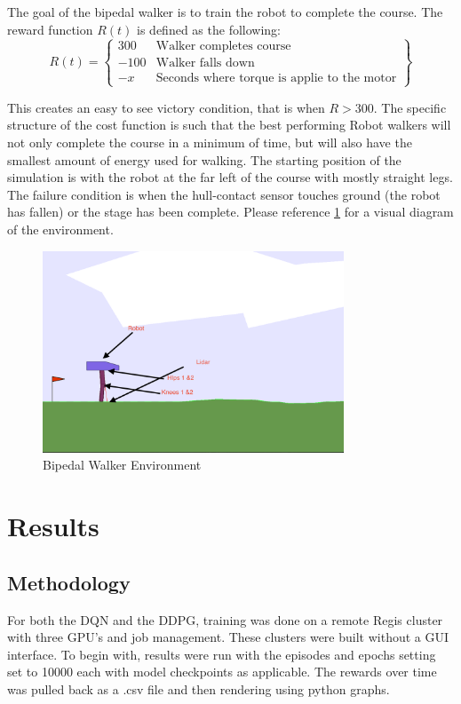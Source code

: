 \documentclass[man, 12pt]{apa6}
\begin{document}
The goal of the bipedal walker is to train the robot to complete the course. The reward function $R(t)$ is defined as the following: 
\[ R(t) = \left \{\begin{array}{lr}
 300 & \text{Walker completes course} \\
 -100 & \text{Walker falls down} \\
 -x & \text{Seconds where torque is applie to the motor} 
\end{array}\right\}  \]

This creates an easy to see victory condition, that is when $R> 300$. The specific structure of the cost function is such that the best performing Robot walkers will not only complete the course in a minimum of time, but will also have the smallest amount of energy used for walking.
The starting position of the simulation is with the robot at the far left of the course with mostly straight legs. The failure condition is when the hull-contact sensor touches ground (the robot has fallen) or the stage has been complete.  Please reference \ref{biped} for a visual diagram of the environment. 

\begin{figure}[H!]
\label{biped}
\caption{Bipedal Walker Environment}
\includegraphics[width = 0.8\textwidth]{bipedal.png}
\end{figure} 
\FloatBarrier
\newpage
\section{Results}
\subsection{Methodology}
For both the DQN and the DDPG, training was done on a remote Regis cluster with three GPU's and job management. These clusters were built without a GUI interface. To begin with, results were run with the episodes and epochs setting set to 10000 each with model checkpoints as applicable. The rewards over time was pulled back as a .csv file and then rendering using python graphs. \
\end{document}
